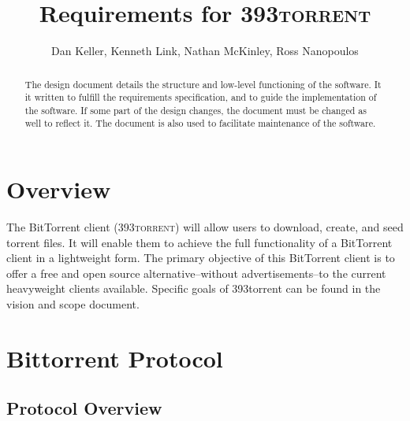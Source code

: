 \documentclass[letter]{scrartcl}
\newcommand{\app}{\textsc{393torrent}}
\begin{document}
\title{Requirements for \app}
\subtitle{Dan Keller, Kenneth Link, Nathan McKinley, Ross Nanopoulos}
\date{} %

\maketitle

\begin{abstract}
The design document details the structure and low-level functioning of the software. It it written to fulfill the requirements specification, and to guide the implementation of the software. If some part of the design changes, the document must be changed as well to reflect it. The document is also used to facilitate maintenance of the software.
\end{abstract}

\tableofcontents
\pagebreak

\section{Overview}
The BitTorrent client (\app) will allow users to download, create, and seed torrent files.  It will enable them to achieve the full functionality of a BitTorrent client in a lightweight form.  The primary objective of this BitTorrent client is to offer a free and open source alternative--without advertisements--to the current heavyweight clients available.  Specific goals of 393torrent can be found in the vision and scope document.

\section{Bittorrent Protocol}

\subsection{Protocol Overview}
	
\end{document}
